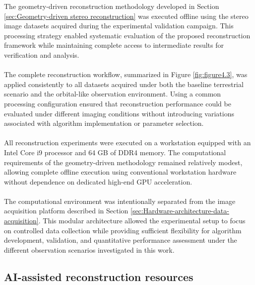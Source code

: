 The geometry-driven reconstruction methodology developed in Section \ref{sec:Geometry-driven stereo reconstruction} was executed offline using the stereo image datasets acquired during the experimental validation campaign. This processing strategy enabled systematic evaluation of the proposed reconstruction framework while maintaining complete access to intermediate results for verification and analysis.
\\\\
The complete reconstruction workflow, summarized in Figure \ref{fig:figure4.3}, was applied consistently to all datasets acquired under both the baseline terrestrial scenario and the orbital-like observation environment. Using a common processing configuration ensured that reconstruction performance could be evaluated under different imaging conditions without introducing variations associated with algorithm implementation or parameter selection.
\\\\
All reconstruction experiments were executed on a workstation equipped with an Intel Core i9 processor and 64 GB of DDR4 memory. The computational requirements of the geometry-driven methodology remained relatively modest, allowing complete offline execution using conventional workstation hardware without dependence on dedicated high-end GPU acceleration.
\\\\
The computational environment was intentionally separated from the image acquisition platform described in Section \ref{sec:Hardware-architecture-data-acquisition}. This modular architecture allowed the experimental setup to focus on controlled data collection while providing sufficient flexibility for algorithm development, validation, and quantitative performance assessment under the different observation scenarios investigated in this work.

\subsection{AI-assisted reconstruction resources}

